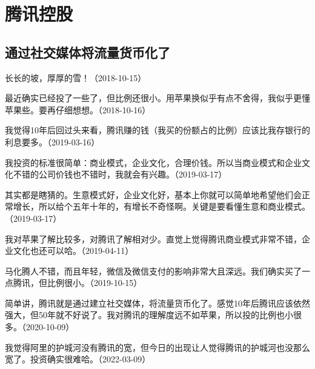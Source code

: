 
\section{腾讯控股}

\subsection{通过社交媒体将流量货币化了}


长长的坡，厚厚的雪！（2018-10-15）

最近确实已经投了一些了，但比例还很小。用苹果换似乎有点不舍得，我似乎更懂苹果些。要再仔细想想。（2018-10-16）

我觉得10年后回过头来看，腾讯赚的钱（我买的份额占的比例）应该比我存银行的利息要多。（2019-03-16）


我投资的标准很简单：商业模式，企业文化，合理价钱。所以当商业模式和企业文化不错的公司价钱也不错时，我就会有兴趣。（2019-03-17）


其实都是瞎猜的。生意模式好，企业文化好，基本上你就可以简单地希望他们会正常增长，所以给个五年十年的，有增长不奇怪啊。关键是要看懂生意和商业模式。（2019-03-17）


我对苹果了解比较多，对腾讯了解相对少。直觉上觉得腾讯商业模式非常不错，企业文化也还可以哈。（2019-04-11）


马化腾人不错，而且年轻，微信及微信支付的影响非常大且深远。我们确实买了一点腾讯，但比例很小。（2019-10-15）


简单讲，腾讯就是通过建立社交媒体，将流量货币化了。感觉10年后腾讯应该依然强大，但50年就不好说了。我对腾讯的理解度远不如苹果，所以投的比例也小很多。（2020-10-09）


我觉得阿里的护城河没有腾讯的宽，但今日的出现让人觉得腾讯的护城河也没那么宽了。投资确实很难哈。（2022-03-09）

